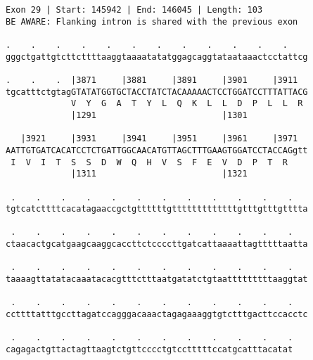 \documentclass{article}
\begin{document}
\begin{Verbatim}
Exon 29 | Start: 145942 | End: 146045 | Length: 103
BE AWARE: Flanking intron is shared with the previous exon
 
.    .    .    .    .    .    .    .    .    .    .    .    
gggctgattgtcttcttttaaggtaaaatatatggagcaggtataataaactcctattcg
  
.    .    .  |3871     |3881     |3891     |3901     |3911  
tgcatttctgtagGTATATGGTGCTACCTATCTACAAAAACTCCTGGATCCTTTATTACG
             V  Y  G  A  T  Y  L  Q  K  L  L  D  P  L  L  R 
             |1291                         |1301            
  
   |3921     |3931     |3941     |3951     |3961     |3971  
AATTGTGATCACATCCTCTGATTGGCAACATGTTAGCTTTGAAGTGGATCCTACCAGgtt
 I  V  I  T  S  S  D  W  Q  H  V  S  F  E  V  D  P  T  R    
             |1311                         |1321            
  
 .    .    .    .    .    .    .    .    .    .    .    .   
tgtcatcttttcacatagaaccgctgttttttgtttttttttttttgtttgtttgtttta
  
 .    .    .    .    .    .    .    .    .    .    .    .   
ctaacactgcatgaagcaaggcaccttctccccttgatcattaaaattagtttttaatta
  
 .    .    .    .    .    .    .    .    .    .    .    .   
taaaagttatatacaaatacacgtttctttaatgatatctgtaatttttttttaaggtat
  
 .    .    .    .    .    .    .    .    .    .    .    .   
ccttttatttgccttagatccagggacaaactagagaaaggtgtctttgacttccacctc
  
 .    .    .    .    .    .    .    .    .    .    .    .
cagagactgttactagttaagtctgttcccctgtcctttttccatgcatttacatat
\end{Verbatim}
\newpage
\end{document}

